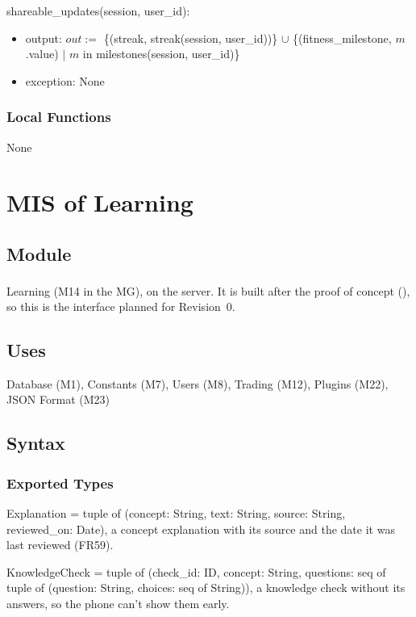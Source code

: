 \documentclass[12pt, titlepage]{article}
\begin{document}
\noindent shareable\_updates(session, user\_id):
\begin{itemize}
\item output: $out :=$ \{(streak, streak(session, user\_id))\} $\cup$
  \{(fitness\_milestone, $m$.value) $|$ $m$ in milestones(session, user\_id)\}
\item exception: None
\end{itemize}

\subsubsection{Local Functions}

None

\par\endgroup

\newpage

\section{MIS of Learning} \label{MisLearning}

\begingroup\raggedright
\subsection{Module}

Learning (M14 in the MG), on the server. It is built after the proof of
concept (\textsuperscript{\dag}), so this is the interface planned for
Revision~0.

\subsection{Uses}

Database (M1), Constants (M7), Users (M8), Trading (M12), Plugins (M22), JSON
Format (M23)

\subsection{Syntax}

\subsubsection{Exported Types}

\noindent Explanation = tuple of (concept: String, text: String, source:
String, reviewed\_on: Date), a concept explanation with its source and the
date it was last reviewed (FR59).

\medskip
\noindent KnowledgeCheck = tuple of (check\_id: ID, concept: String,
questions: seq of tuple of (question: String, choices: seq of String)), a
knowledge check without its answers, so the phone can't show them early.
\end{document}

